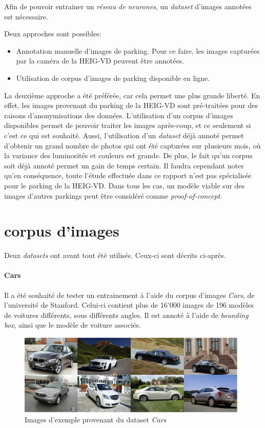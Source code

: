 Afin de pouvoir entrainer un \textit{réseau de neurones}, un \textit{dataset} d'images annotées est nécessaire.

Deux approches sont possibles:
\begin{itemize}
    \item Annotation manuelle d'images de parking. Pour ce faire, les images capturées par la caméra de la HEIG-VD peuvent être annotées. 
    \item Utilisation de corpus d'images de parking disponible en ligne.
\end{itemize}

La deuxième approche a été préférée, car cela permet une plus grande liberté. En effet, les images provenant du parking de la HEIG-VD sont pré-traitées pour des raisons d'anonymisations des données. L'utilisation d'un corpus d'images disponibles permet de pouvoir traiter les images après-coup, et ce seulement si c'est ce qui est souhaité. Aussi, l'utilisation d'un \textit{dataset} déjà annoté permet d'obtenir un grand nombre de photos qui ont été capturées sur plusieurs mois, où la variance des luminosités et couleurs est grande. De plus, le fait qu'un corpus soit déjà annoté permet un gain de temps certain. Il faudra cependant noter qu'en conséquence, toute l'étude effectuée dans ce rapport n'est pas spécialisée pour le parking de la HEIG-VD. Dans tous les cas, un modèle viable sur des images d'autres parkings peut être considéré comme \textit{proof-of-concept}.

\section{corpus d'images}\label{conception.dataset}
Deux \textit{datasets} ont avant tout été utilisés. Ceux-ci sont décrits ci-après.

\paragraph{Cars}
Il a été souhaité de tester un entrainement à l'aide du corpus d'images \textit{Cars}\autocite{data:cars}, de l'université de Stanford. Celui-ci contient plus de 16'000 images de 196 modèles de voitures différents, sous différents angles. Il est annoté à l'aide de \textit{bounding box}, ainsi que le modèle de voiture associés. 

\begin{figure}[ht]
    \includegraphics[width=110mm]{img/conception/cars_example.png}
    \centering
    \caption{Images d'exemple provenant du dataset \textit{Cars}}
\end{figure}

